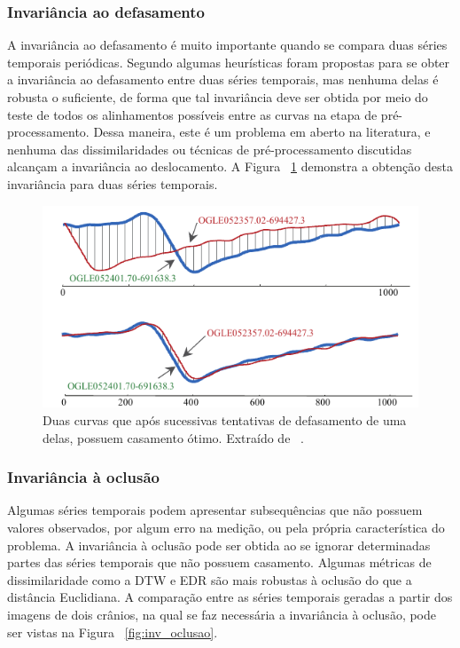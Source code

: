 \subsubsection{Invariância ao defasamento}

A invariância ao defasamento é muito importante quando se compara duas séries temporais periódicas. Segundo \parencite{CID} algumas heurísticas foram propostas para se obter a invariância ao defasamento entre duas séries temporais, mas nenhuma delas é robusta o suficiente, de forma que tal invariância deve ser obtida por meio do teste de todos os alinhamentos possíveis entre as curvas na etapa de pré-processamento. Dessa maneira, este é um problema em aberto na literatura, e nenhuma das dissimilaridades ou técnicas de pré-processamento discutidas alcançam a invariância ao deslocamento. A Figura ~\ref{fig:inv_defasamento} demonstra a obtenção desta invariância para duas séries temporais.

\begin{figure}[h!]
	\includegraphics[width=\linewidth]{figuras/invariancias/defasamento.png}
	\caption{Duas curvas que após sucessivas tentativas de defasamento de uma delas, possuem casamento ótimo. Extraído de ~\parencite{CID}.}
	\label{fig:inv_defasamento}
\end{figure}

\subsubsection{Invariância à oclusão}

Algumas séries temporais podem apresentar subsequências que não possuem valores observados, por algum erro na medição, ou pela própria característica do problema. A invariância à oclusão pode ser obtida ao se ignorar determinadas partes das séries temporais que não possuem casamento. Algumas métricas de dissimilaridade como a DTW e EDR são mais robustas à oclusão do que a distância Euclidiana. A comparação entre as séries temporais geradas a partir dos imagens de dois crânios, na qual se faz necessária a invariância à oclusão, pode ser vistas na Figura ~\ref{fig:inv_oclusao}.

